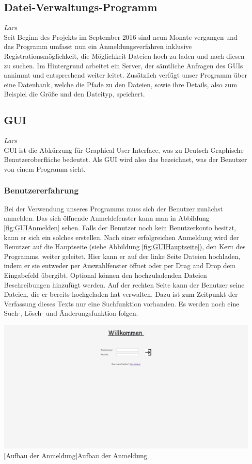 \documentclass[12pt,a4paper,bibliography=totocnumbered,listof=totocnumbered]{scrartcl}
\begin{document}
\subsection{Datei-Verwaltungs-Programm}
\emph{Lars}\\
Seit Beginn des Projekts im September 2016 sind neun Monate vergangen und das Programm umfasst nun ein Anmeldungsverfahren inklusive Registrationsmöglichkeit, die Möglichkeit Dateien hoch zu laden und nach diesen zu suchen. Im Hintergrund arbeitet ein Server, der sämtliche Anfragen des GUIs annimmt und entsprechend weiter leitet. Zusätzlich verfügt unser Programm über eine Datenbank, welche die Pfade zu den Dateien, sowie ihre Details, also zum Beispiel die Größe und den Dateityp, speichert.

\subsection{GUI}
\label{GUI}
\emph{Lars}\\
GUI ist die Abkürzung für \glqq Graphical User Interface\grqq , was zu Deutsch \glqq Graphische Benutzeroberfläche\grqq{} bedeutet. Als GUI wird also das bezeichnet, was der Benutzer von einem Programm sieht. \\

\subsubsection{Benutzererfahrung}
\label{Benutzererfahrung}
Bei der Verwendung unseres Programms muss sich der Benutzer zunächst anmelden. Das sich öffnende Anmeldefenster kann man in Abbildung \ref{fig:GUIAnmelden} sehen. Falls der Benutzer noch kein Benutzerkonto besitzt, kann er sich ein solches erstellen. Nach einer erfolgreichen Anmeldung wird der Benutzer auf die Hauptseite (siehe Abbildung \ref{fig:GUIHauptseite}), den Kern des Programms, weiter geleitet. Hier kann er auf der linke Seite Dateien hochladen, indem er sie entweder per Auswahlfenster öffnet oder per Drag and Drop dem Eingabefeld übergibt. Optional können den hochzuladenden Dateien Beschreibungen hinzufügt werden. Auf der rechten Seite kann der Benutzer seine Dateien, die er bereits hochgeladen hat verwalten. Dazu ist zum Zeitpunkt der Verfassung dieses Texts nur eine Suchfunktion vorhanden. Es werden noch eine Such-, Lösch- und Änderungsfunktion folgen.\\

\vspace{1em}
\begin{minipage}{\linewidth}
	\centering
	\includegraphics[width=0.7\linewidth]{Bilder/GUIAnmelden.png}
	[Aufbau der Anmeldung]{Aufbau der Anmeldung}
	\label{fig:GUIAnmelden}
\end{minipage}
\end{document}

